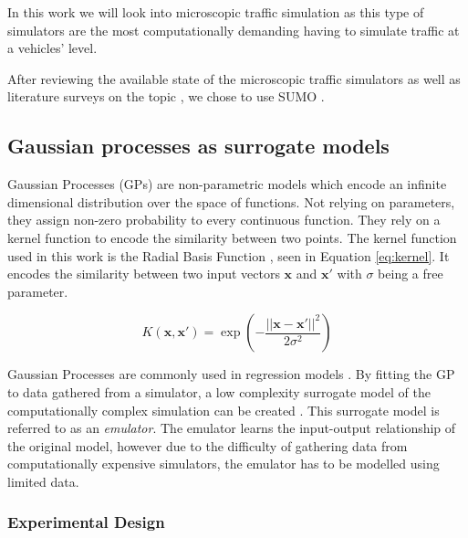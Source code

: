 In this work we will look into microscopic traffic simulation as this type of simulators are the most computationally demanding having to simulate traffic at a vehicles' level. 

After reviewing the available state of the microscopic traffic simulators \cite{w2016multi, barcelo2005dynamic, krajzewicz2002sumo} as well as literature surveys on the topic \cite{kotusevski2009review}, we chose to use SUMO \cite{krajzewicz2002sumo}.



\subsection{Gaussian processes as surrogate models}

Gaussian Processes (GPs) are non-parametric models which encode an infinite dimensional distribution over the space of functions. Not relying on parameters, they assign non-zero probability to every continuous function. They rely on a kernel function to encode the similarity between two points. The kernel function used in this work is the Radial Basis Function \cite{chen2003new}, seen in Equation \ref{eq:kernel}. It encodes the similarity between two input vectors $\mathbf{x}$ and $\mathbf{x'}$ with $\sigma$ being a free parameter.

\begin{equation}
    K(\mathbf{x},\mathbf{x'}) = \exp{\left ( -\frac{|| \mathbf{x}-\mathbf{x'}||^2 }{2\sigma^2}\right )}
    \label{eq:kernel}
\end{equation}


Gaussian Processes are commonly used in regression models \cite{gramacy2020surrogates}. By fitting the GP to data gathered from a simulator, a low complexity surrogate model of the computationally complex simulation can be created \cite{sudret2017surrogate}. This surrogate model is referred to as an \textit{emulator}. The emulator learns the input-output relationship of the original model, however due to the difficulty of gathering data from computationally expensive simulators, the emulator has to be modelled using limited data.

\subsubsection{Experimental Design} %

